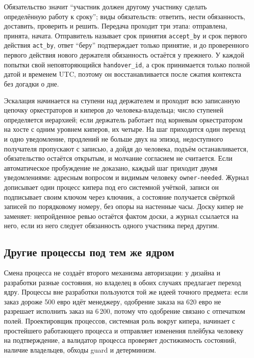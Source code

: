 \documentclass[10pt,a4paper]{article}
\begin{document}
Обязательство значит ``участник должен другому участнику сделать определённую работу к сроку''; виды обязательств: ответить, нести обязанность, доставить, проверить и решить. Передача проходит три этапа: отправлена, принята, начата. Отправитель называет срок принятия \texttt{accept\_by} и срок первого действия \texttt{act\_by}, ответ ``беру'' подтверждает только принятие, и до проверенного первого действия нового держателя обязанность остаётся у прежнего. У каждой попытки свой неповторяющийся \texttt{handover\_id}, а срок принимается только полной датой и временем UTC, поэтому он восстанавливается после сжатия контекста без догадки о дне.

Эскалация начинается на ступени над держателем и проходит всю записанную цепочку оркестраторов и киперов до человека-владельца; число ступеней определяется иерархией; если держатель работает под корневым оркестратором на хосте с одним уровнем киперов, их четыре. На шаг приходится один переход и одно уведомление, продлений не больше двух на эпизод, недоступного получателя пропускают с записью, а дойдя до человека, подъём останавливается, обязательство остаётся открытым, и молчание согласием не считается. Если автоматическое пробуждение не доказано, каждый шаг приходит двумя уведомлениями: адресным вопросом и видимым человеку \texttt{owner-needed}. Журнал дописывает один процесс кипера под его системной учёткой, записи он подписывает своим ключом через ключник, а состояние получается свёрткой записей по порядковому номеру, без опоры на настенные часы. Доску кипер не заменяет: непройденное ревью остаётся фактом доски, а журнал ссылается на него, если из него следует обязанность одного участника перед другим.

\subsection{Другие процессы под тем же ядром}

Смена процесса не создаёт второго механизма авторизации: у дизайна и разработки разные состояния, но владелец в обоих случаях предлагает переход ядру. Процессы вне разработки пользуются той же идеей точного предмета: если заказ дороже 500 евро идёт менеджеру, одобрение заказа на 620 евро не разрешает исполнить заказ на 6\,200, потому что одобрение связано с отпечатком полей. Проектировщик процессов, системная роль вокруг кипера, начинает с простейшего работающего процесса и отправляет изменения плейбука человеку на подтверждение, а валидатор процесса проверяет достижимость состояний, наличие владельцев, обходы guard и детерминизм.
\end{document}
